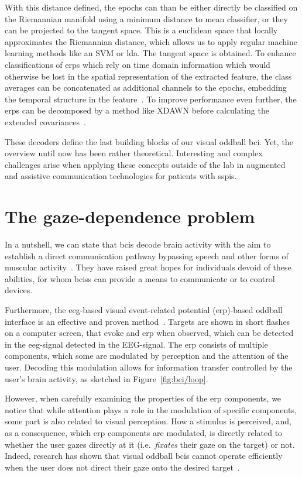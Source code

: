With this distance defined, the epochs can than be either directly be
classified on the Riemannian manifold using a minimum distance to mean
classifier, or they can be projected to the tangent space.
This is a euclidean space that locally approximates the Riemannian distance,
which allows us to apply regular machine learning methods like an SVM or
\ac{lda}.
The tangent space is obtained.
To enhance classifications of \acp{erp} which rely on time domain information
which would otherwise be lost in the spatial representation of the extracted
feature, the class averages can be concatenated as additional channels to the
epochs, embedding the temporal structure in the feature~\cite{Barachant2014}.
To improve performance even further, the \acp{erp} can be decomposed by a method
like XDAWN before calculating the extended covariances~\cite{Li2020}.

These decoders define the last building blocks of our visual oddball \ac{bci}.
Yet, the overview until now has been rather theoretical.
Interesting and complex challenges arise when applying these concepts outside
of the lab in augmented and assistive communication technologies for patients
with \acp{sspi}.

\section{The gaze-dependence problem}

In a nutshell, we can state that \acp{bci} decode brain activity with the aim to
establish a direct communication pathway bypassing speech and other forms of
muscular activity~\cite{Naci2012,Chaudhary2016}.
They have raised great hopes for individuals devoid of these abilities, for whom
\acp{bci}s can provide a means to communicate or to
control devices.

Furthermore, the \ac{eeg}-based visual event-related potential (\ac{erp})-based
oddball interface is an effective and proven method~\cite{Wolpaw2018,Severens2020}.
Targets are shown in short flashes on a computer screen, that evoke
and \ac{erp} when observed, which can be detected in the \ac{eeg}-signal
detected in the EEG-signal.
The \ac{erp} consists of multiple components, which some are modulated by
perception and the attention of the user.
Decoding this modulation allows for information transfer controlled by the
user's brain activity, as sketched in Figure~\ref{fig:bci/loop}.

However, when carefully examining the properties of the \ac{erp} components,
we notice that while attention plays a role in the modulation of specific components,
some part is also related to visual perception.
How a stimulus is perceived, and, as a consequence, which \ac{erp} components
are modulated, is directly related to whether the user gazes directly at it
(i.e.\ \emph{fixates} their gaze on the target) or not.
Indeed, research has shown that visual oddball \ac{bci}s cannot operate
efficiently when the user does not direct
their gaze onto the desired target~\cite{Brunner2010, Frenzel2011}.

